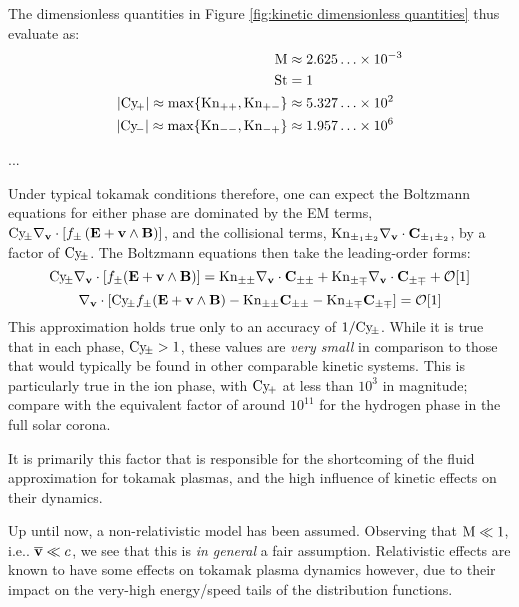     The dimensionless quantities in Figure \ref{fig:kinetic dimensionless quantities} thus evaluate as:
    \begin{align}
                                                           \mathrm{M}  &\approx  2.625\ldots\times 10^{- 3}  \\
                                                          \mathrm{St}  &=        1                           \\
        |\mathrm{Cy}\!_{+}|  \approx  \max\{\mathrm{Kn}_{++},  \mathrm{Kn}_{+-}\}  &\approx  5.327\ldots\times 10^{2}    \\
        |\mathrm{Cy}\!_{-}|  \approx  \max\{\mathrm{Kn}_{--},  \mathrm{Kn}_{-+}\}  &\approx  1.957\ldots\times 10^{6}
    \end{align}

    ...

    Under typical tokamak conditions therefore, one can expect the Boltzmann equations for either phase are dominated by the EM terms, $\mathrm{Cy}\!_{\pm}\nabla_{\mathbf{v}}\cdot[f_{\pm}\left(\mathbf{E} + \mathbf{v}\wedge\mathbf{B}\right)]$, and the collisional terms, $\mathrm{Kn}_{\pm_{1}\pm_{2}}\nabla_{\mathbf{v}}\cdot\mathbf{C}_{\pm_{1}\pm_{2}}$, by a factor of $\mathrm{Cy}\!_{\pm}$. The Boltzmann equations then take the leading-order forms:
    \begin{equation}
        \mathrm{Cy}\!_{\pm}\nabla_{\mathbf{v}}\cdot[f_{\pm}(\mathbf{E} + \mathbf{v}\wedge\mathbf{B})]  =  \mathrm{Kn}_{\pm\pm}\nabla_{\mathbf{v}}\cdot\mathbf{C}_{\pm\pm} + \mathrm{Kn}_{\pm\mp}\nabla_{\mathbf{v}}\cdot\mathbf{C}_{\pm\mp} + \mathcal{O}[1]
    \end{equation}
    \begin{equation}
        \nabla_{\mathbf{v}}\cdot[\mathrm{Cy}\!_{\pm}f_{\pm}(\mathbf{E} + \mathbf{v}\wedge\mathbf{B}) - \mathrm{Kn}_{\pm\pm}\mathbf{C}_{\pm\pm} - \mathrm{Kn}_{\pm\mp}\mathbf{C}_{\pm\mp}]  =  \mathcal{O}[1]  \label{eqn:leading-order Boltzmann equation}
    \end{equation}
    This approximation holds true only to an accuracy of $1/\mathrm{Cy}\!_{\pm}$. While it is true that in each phase, $\mathrm{Cy}\!_{\pm} > 1$, these values are \emph{very small} in comparison to those that would typically be found in other comparable kinetic systems. This is particularly true in the ion phase, with $\mathrm{Cy}\!_{+}$ at less than $10^{3}$ in magnitude; compare with the equivalent factor of around $10^{11}$ for the hydrogen phase in the full solar corona.

    It is primarily this factor that is responsible for the shortcoming of the fluid approximation for tokamak plasmas, and the high influence of kinetic effects on their dynamics.

    \begin{remark}
        Up until now, a non-relativistic model has been assumed. Observing that $\mathrm{M}  \ll  1$, i.e.. $\overline{\mathbf{v}}  \ll  c$, we see that this is \emph{in general} a fair assumption. Relativistic effects are known to have some effects on tokamak plasma dynamics however, due to their impact on the very-high energy/speed tails of the distribution functions. \BA{[Ref]}
    \end{remark}
    